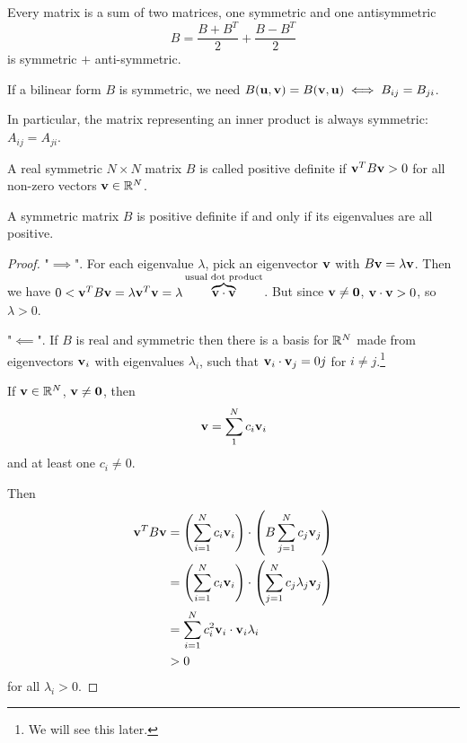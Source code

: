 \documentclass[10pt, a4paper]{article}
\begin{document}
Every matrix is a sum of two matrices,
one symmetric and one antisymmetric
\[
B = \frac{B + B ^ T}{2} + \frac{B - B ^ T}{2}
\]
is symmetric $+$ anti-symmetric.

If a bilinear form $B$ is symmetric,
we need $B(\mathbf{u}, \mathbf{v}) = B(\mathbf{v}, \mathbf{u}) \iff B_{ij} = B_{ji}$.

In particular,
the matrix representing an inner product is always symmetric:
$A_{ij} = A_{ji}$.

\begin{definition}
    A real symmetric $N \times N$ matrix $B$ is called positive definite if $\mathbf{v} ^ TB\mathbf{v} > 0$ for all non-zero vectors $\mathbf{v} \in \mathbb{R} ^ N$.
\end{definition}

\begin{proposition}
    A symmetric matrix $B$ is positive definite if and only if its eigenvalues are all positive.

    \begin{proof}
        "$\implies$".
        For each eigenvalue $\lambda$,
        pick an eigenvector $\mathbf{v}$ with $B\mathbf{v} = \lambda\mathbf{v}$.
        Then we have $0 < \mathbf{v} ^ TB\mathbf{v} = \lambda\mathbf{v} ^ T\mathbf{v} = \lambda\overbrace{\mathbf{v} \cdot \mathbf{v}} ^ {\text{usual dot product}}$.
        But since $\mathbf{v} \neq \mathbf{0}$,
        $\mathbf{v} \cdot \mathbf{v} > 0$,
        so $\lambda > 0$.

        "$\impliedby$".
        If $B$ is real and symmetric then there is a basis for $\mathbb{R} ^ N$ made from eigenvectors $\mathbf{v}_i$ with eigenvalues $\lambda_i$,
        such that $\mathbf{v}_i \cdot \mathbf{v}_j = 0j$ for $i \neq j$.\footnote{We will see this later.}

        If $\mathbf{v} \in \mathbb{R} ^ N$,
        $\mathbf{v} \neq \mathbf{0}$,
        then
        \[
        \mathbf{v} = \sum_{1}^{N}c_i\mathbf{v}_i
        \]
        and at least one $c_i \neq 0$.

        Then
        \begin{align*}
            \mathbf{v} ^ TB\mathbf{v} &= \left(\sum_{i = 1}^{N}c_i\mathbf{v}_i\right) \cdot \left(B\sum_{j = 1}^{N}c_j\mathbf{v}_j\right) \\
            &= \left(\sum_{i = 1}^{N}c_i\mathbf{v}_i\right) \cdot \left(\sum_{j = 1}^{N}c_j\lambda_j\mathbf{v}_j\right) \\
            &= \sum_{i = 1}^{N}c_i ^ 2\mathbf{v}_i\cdot \mathbf{v}_i\lambda_i \\
            &> 0
        \end{align*}
        for all $\lambda_i > 0$.
    \end{proof}
\end{proposition}
\end{document}
